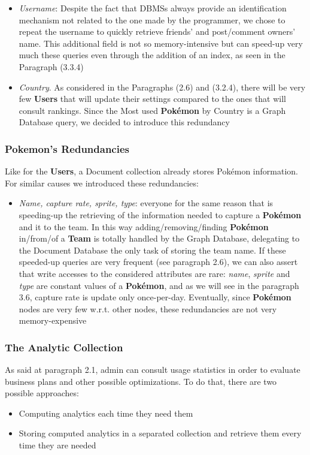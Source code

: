 \begin{itemize}
	\item \textit{Username}: Despite the fact that DBMSs always provide an identification mechanism not related to the one made by the programmer, we chose to repeat the username to quickly retrieve friends’ and post/comment owners’ name. 
	This additional field is not so memory-intensive but can speed-up very much these queries even through the addition of an index, as seen in the Paragraph (3.3.4) 
	\item \textit{Country}. As considered in the Paragraphs (2.6) and (3.2.4), there will be very few \textbf{Users} that will update their settings compared to the ones that will consult rankings. Since the Most used \textbf{Pokémon} by Country is a Graph Database query, we decided to introduce this redundancy
\end{itemize}

\subsubsection{Pokemon's Redundancies}
Like for the \textbf{Users}, a Document collection already stores Pokémon information. For similar causes we introduced these redundancies:
\begin{itemize}
	\item \textit{Name, capture rate, sprite, type}: everyone for the same reason that is speeding-up the retrieving of the information needed to capture a \textbf{Pokémon} and it to the team. In this way adding/removing/finding \textbf{Pokémon} in/from/of a \textbf{Team} is totally handled by the Graph Database, delegating to the Document Database the only task of storing the team name. 
	If these speeded-up queries are very frequent (see paragraph 2.6), we can also assert that write accesses to the considered attributes are rare: \textit{name}, \textit{sprite} and \textit{type} are constant values of a \textbf{Pokémon}, and as we will see in the paragraph 3.6, capture rate is update only once-per-day.
	Eventually, since \textbf{Pokémon} nodes are very few w.r.t. other nodes, these redundancies are not very memory-expensive
\end{itemize}

\subsubsection{The Analytic Collection}
As said at paragraph 2.1, admin can consult usage statistics in order to evaluate business plans and other possible optimizations. 
To do that, there are two possible approaches:
\begin{itemize}
	\item Computing analytics each time they need them
	\item Storing computed analytics in a separated collection and retrieve them every time they are needed
\end{itemize}

